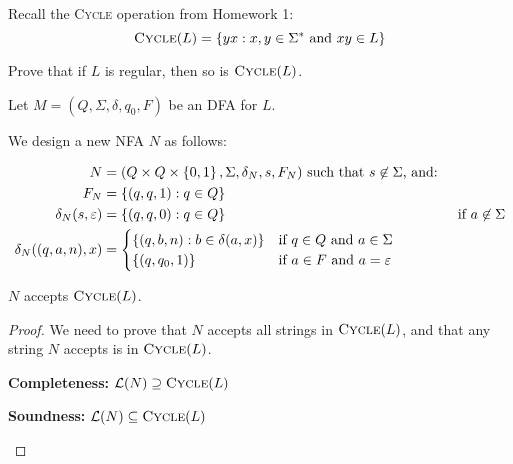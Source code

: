 \begin{problem}
  Recall the \textsc{Cycle} operation from Homework 1:
  \[ \textsc{Cycle}(L) = \left\{yx : x, y \in \Sigma^* \text{ and } xy \in L\right\} \]
  
  \step
  Prove that if $L$ is regular, then so is $\textsc{Cycle}(L)$.
  \begin{Answer}
    Let $M = (Q, \Sigma, \delta, q_0, F)$ be an DFA for $L$.
    
    \step
    We design a new NFA $N$ as follows:

    \begin{align}
      N &= (Q \times Q \times \left\{0, 1\right\}, \Sigma, \delta_N, s, F_N) \text{ such that $s \not\in \Sigma$, and: }\nonumber \\
      F_N &= \left\{(q, q, 1) : q \in Q\right\}\\
      \delta_N(s, \varepsilon) &= \left\{(q, q, 0) : q \in Q\right\} & \text{if } a \not\in \Sigma\\
      \delta_N((q, a, n), x) &=
        \begin{cases}
          \left\{(q, b, n) : b \in \delta(a, x)\right\} & \text{if } q \in Q \text{ and } a \in \Sigma\\
          \left\{(q, q_0, 1)\right\} & \text{if } a \in F \text{ and } a = \varepsilon
        \end{cases}
    \end{align}
    \begin{claim}
      $N$ accepts $\textsc{Cycle}(L)$.

      \begin{proof}
        We need to prove that $N$ accepts all strings in $\textsc{Cycle}(L)$,
        and that any string $N$ accepts is in $\textsc{Cycle}(L)$.
        \begin{enumroman}
          \item \textbf{Completeness:} $\mathcal{L}(N) \supseteq \textsc{Cycle}(L)$
          \item \textbf{Soundness:}  $\mathcal{L}(N) \subseteq \textsc{Cycle}(L)$
        \end{enumroman}
      \end{proof}
    \end{claim}
  \end{Answer}
\end{problem}
